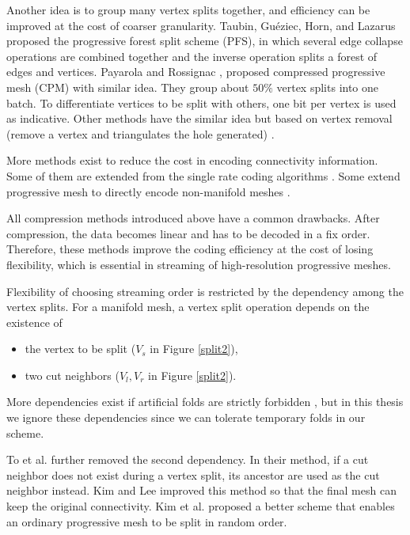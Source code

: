     Another idea is to group many vertex splits together, 
    and efficiency can be improved at the cost of coarser granularity. 
    Taubin, Gu\'{e}ziec, Horn, and Lazarus \cite{280834} proposed the
    progressive forest split scheme (PFS), in which several edge
    collapse operations are combined together and the inverse operation splits a
    forest of edges and vertices. 
    Payarola and Rossignac \cite{614450}, 
    proposed compressed progressive mesh (CPM)\label{cpm} with similar
    idea. They group about $50\%$ vertex splits into one batch. To
    differentiate vertices to be split with others, one bit per vertex
    is used as indicative. 
    Other methods have the similar idea
    but based on vertex removal (remove a vertex and triangulates the hole
    generated) \cite{319358}. 

    More methods exist to reduce the cost in encoding connectivity information.
    Some of them are extended from the single rate coding algorithms
    \cite{319426, 383281}. Some extend progressive mesh to directly
    encode non-manifold meshes \cite{258852}.

    All compression methods introduced above 
    have a common drawbacks. After compression, the 
    data becomes linear and has to be decoded in a fix order. 
    Therefore, these methods improve the coding efficiency at the cost
    of losing flexibility, which is essential in streaming of high-resolution
    progressive meshes.
    
    Flexibility of choosing streaming order 
    is restricted by the dependency among the vertex splits.
    For a manifold mesh, a vertex split operation depends on the existence of
    \begin{itemize}
        \item 
    the vertex to be split ($V_s$ in Figure \ref{split2}), 
        \item 
    two cut neighbors ($V_l, V_r$ in Figure \ref{split2}). 
    \end{itemize}
    More dependencies exist if artificial folds are strictly forbidden \cite{258843, 258847}, 
    but in this thesis we ignore these dependencies since we can 
    tolerate temporary folds in our scheme.
     
    To et al. \cite{To1999} further removed the second dependency.
    In their method, if a cut neighbor does not exist during a vertex split,
    its ancestor are used as the cut neighbor instead.
    Kim and Lee \cite{kim01truly} improved this method so that the final mesh
    can keep the original connectivity. 
    Kim et al. \cite{multiresolution:kim} proposed a better scheme that enables
    an ordinary progressive mesh to be split in random order.

